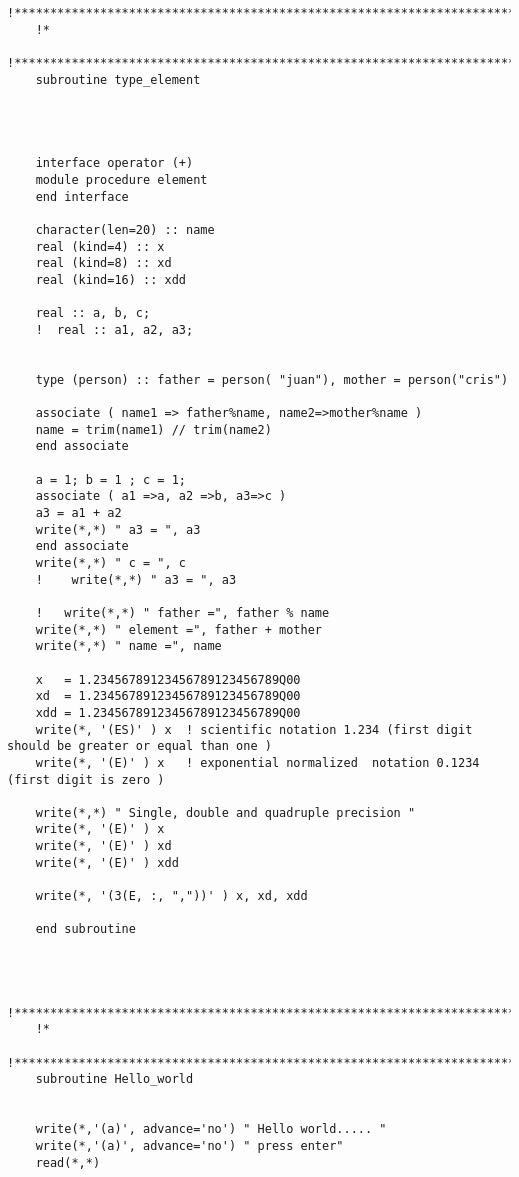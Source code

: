     \begin{verbatim}
    
    !*****************************************************************************
    !*
    !*****************************************************************************
    subroutine type_element 
    
    
    
    
    interface operator (+) 
    module procedure element
    end interface 
    
    character(len=20) :: name 
    real (kind=4) :: x 
    real (kind=8) :: xd 
    real (kind=16) :: xdd 
    
    real :: a, b, c; 
    !  real :: a1, a2, a3; 
    
    
    type (person) :: father = person( "juan"), mother = person("cris")  
    
    associate ( name1 => father%name, name2=>mother%name )
    name = trim(name1) // trim(name2)  
    end associate 
    
    a = 1; b = 1 ; c = 1; 
    associate ( a1 =>a, a2 =>b, a3=>c ) 
    a3 = a1 + a2 
    write(*,*) " a3 = ", a3 
    end associate 
    write(*,*) " c = ", c 
    !    write(*,*) " a3 = ", a3 
    
    !   write(*,*) " father =", father % name
    write(*,*) " element =", father + mother 
    write(*,*) " name =", name 
    
    x   = 1.23456789123456789123456789Q00
    xd  = 1.23456789123456789123456789Q00
    xdd = 1.23456789123456789123456789Q00
    write(*, '(ES)' ) x  ! scientific notation 1.234 (first digit should be greater or equal than one ) 
    write(*, '(E)' ) x   ! exponential normalized  notation 0.1234 (first digit is zero ) 
    
    write(*,*) " Single, double and quadruple precision "
    write(*, '(E)' ) x 
    write(*, '(E)' ) xd
    write(*, '(E)' ) xdd
    
    write(*, '(3(E, :, ","))' ) x, xd, xdd
    
    end subroutine 
    
    
    
    !*****************************************************************************
    !*
    !*****************************************************************************
    subroutine Hello_world 
    
    
    write(*,'(a)', advance='no') " Hello world..... " 
    write(*,'(a)', advance='no') " press enter"
    read(*,*) 
    

\end{verbatim}
